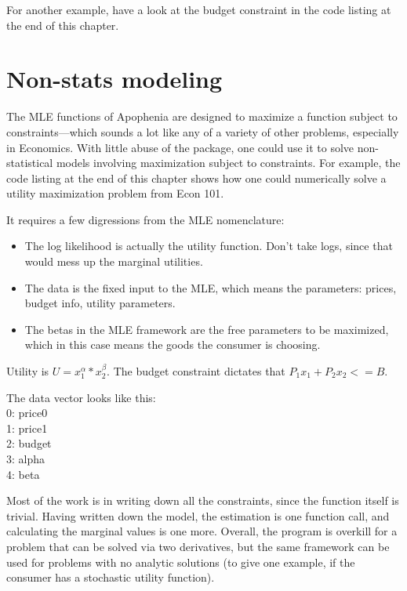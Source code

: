 For another example, have a look at the budget constraint in the code
listing at the end of this chapter.

\section{Non-stats modeling}    \label{econ101}

The MLE functions of Apophenia are designed to maximize a function
subject to constraints---which sounds a lot like any of a variety of
other problems, especially in Economics. With little abuse of the package,
one could use it to solve non-statistical models involving maximization
subject to constraints. For example, the code listing at the end of this
chapter shows how one could numerically solve a utility maximization
problem from Econ 101. 

It requires a few digressions from the MLE nomenclature:
\begin{itemize}
\item The log likelihood is actually the utility function. Don't take logs,
since that would mess up the marginal utilities.

\item The data is the fixed input to the MLE, which means the parameters:
prices, budget info, utility parameters.

\item The betas in the MLE framework are the free parameters to be
maximized, which in this case means the goods the consumer is choosing.
\end{itemize}

Utility is $U = x_1^\alpha * x_2^\beta$. 
The budget constraint dictates that $P_1 x_1 + P_2 x_2 <= B$.
                                                             
The data vector looks like this:\\
0:  price0\\
1:  price1\\
2:  budget \\
3:  alpha  \\
4:  beta   
                                                             
Most of the work is in writing down all the constraints, since the
function itself is trivial. Having written down the model, the estimation
is one function call, and calculating the marginal values is one more.
Overall, the program is overkill for a problem that can be solved via
two derivatives, but the same framework can be used for problems with no
analytic solutions (to give one example, if the consumer has a stochastic
utility function).


